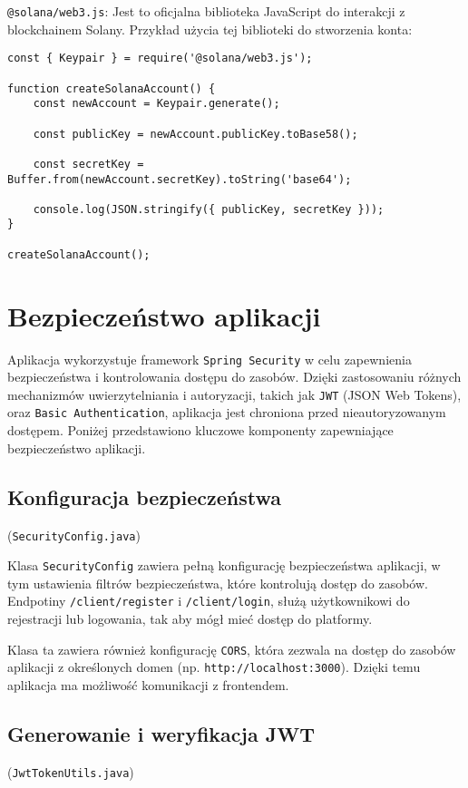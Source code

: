  \texttt{@solana/web3.js}: Jest to oficjalna biblioteka JavaScript do interakcji z blockchainem Solany.  
  Przykład użycia tej biblioteki do stworzenia konta:
  \begin{lstlisting}
const { Keypair } = require('@solana/web3.js');

function createSolanaAccount() {
    const newAccount = Keypair.generate();

    const publicKey = newAccount.publicKey.toBase58();

    const secretKey = Buffer.from(newAccount.secretKey).toString('base64');

    console.log(JSON.stringify({ publicKey, secretKey }));
}

createSolanaAccount();
  \end{lstlisting}
	
\section{Bezpieczeństwo aplikacji}

Aplikacja wykorzystuje framework \texttt{Spring Security} w celu zapewnienia bezpieczeństwa i kontrolowania dostępu do zasobów. Dzięki zastosowaniu różnych mechanizmów uwierzytelniania i autoryzacji, takich jak \texttt{JWT} (JSON Web Tokens), oraz \texttt{Basic Authentication}, aplikacja jest chroniona przed nieautoryzowanym dostępem. Poniżej przedstawiono kluczowe komponenty zapewniające bezpieczeństwo aplikacji.

\subsection{Konfiguracja bezpieczeństwa} (\texttt{SecurityConfig.java})

Klasa \texttt{SecurityConfig} zawiera pełną konfigurację bezpieczeństwa aplikacji, w tym ustawienia filtrów bezpieczeństwa, które kontrolują dostęp do zasobów. Endpotiny \texttt{/client/register} i \texttt{/client/login}, służą użytkownikowi do rejestracji lub logowania, tak aby mógł mieć dostęp do platformy. 

Klasa ta zawiera również konfigurację \texttt{CORS}, która zezwala na dostęp do zasobów aplikacji z określonych domen (np. \texttt{http://localhost:3000}). Dzięki temu aplikacja ma możliwość komunikacji z frontendem.

\subsection{Generowanie i weryfikacja JWT} (\texttt{JwtTokenUtils.java})

